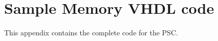 \chapter{Sample Memory VHDL code} \label{App:EXT_MEM_RW_CODE}

This appendix contains the complete code for the PSC.

 
